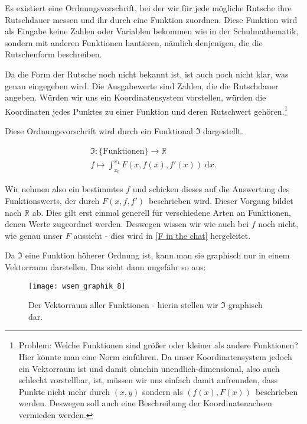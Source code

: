 Es existiert eine Ordnungsvorschrift, bei der wir für jede mögliche Rutsche ihre Rutschdauer messen und ihr durch eine Funktion zuordnen. 
Diese Funktion wird als Eingabe keine Zahlen oder Variablen bekommen wie in der Schulmathematik, sondern mit anderen Funktionen hantieren, nämlich denjenigen, die die Rutschenform beschreiben. 

Da die Form der Rutsche noch nicht bekannt ist, ist auch noch nicht klar, was genau eingegeben wird. 
Die Ausgabewerte sind Zahlen, die die Rutschdauer angeben.
Würden wir uns ein Koordinatensystem vorstellen, würden die Koordinaten jedes Punktes zu einer Funktion und deren Rutschwert gehören.\footnote{Problem: Welche Funktionen sind größer oder kleiner als andere Funktionen? Hier könnte man eine Norm einführen. Da unser Koordinatensystem jedoch ein Vektorraum ist und damit ohnehin unendlich-dimensional, also auch schlecht vorstellbar, ist, müssen wir uns einfach damit anfreunden, dass Punkte nicht mehr durch $(x,y)$ sondern als $(f(x), F(x)) \,$ beschrieben werden. Deswegen soll auch eine Beschreibung der Koordinatenachsen vermieden werden.}


Diese Ordnungsvorschrift wird durch ein Funktional $\mathfrak{I}$ dargestellt.

\begin{equation}
 \begin{gathered}
   \mathfrak{I}\colon
   { \{\text{Funktionen}\}} \rightarrow {\mathbb{R}} \\ 
    f \mapsto \int_{x_0}^{x_1} F(x, f(x), f'(x))  \; \text{d} x.
 \end{gathered}
\end{equation}


Wir nehmen also ein bestimmtes $f$ und schicken dieses auf die Auswertung des Funktionswerts, der durch $F(x,f, f')\,$ beschrieben wird. Dieser Vorgang bildet nach $\mathbb{R}$ ab. 
Dies gilt erst einmal generell für verschiedene Arten an Funktionen, denen Werte zugeordnet werden. 
Deswegen wissen wir wie auch bei $f$ noch nicht, wie genau unser $F$ aussieht - dies wird in \ref{F in the chat} hergeleitet.

Da $\mathfrak{I}$ eine Funktion höherer Ordnung ist, kann man sie graphisch nur in einem Vektorraum darstellen. 
Das sieht dann ungefähr so aus:
\begin{figure}[ht]
 \centering
 \texttt{[image: wsem\_graphik\_8]}
 \caption[Leerer Vektorraum. TikZ - eigene Arbeit.]{Der Vektorraum aller Funktionen - hierin stellen wir $\mathfrak{I}$ graphisch dar.}
 \label{fig:vektfunc}
\end{figure}

